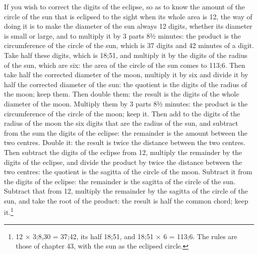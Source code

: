 \documentclass[11pt]{article}
\begin{document}
\par If you wish to correct the digits of the eclipse, so as to know the amount of the circle of the sun that is eclipsed to the sight when its whole area is 12, the way of doing it is to make the diameter of the sun always 12 digits, whether its diameter is small or large, and to multiply it by 3 parts 8½ minutes: the product is the circumference of the circle of the sun, which is 37 digits and 42 minutes of a digit. Take half these digits, which is 18;51, and multiply it by the digits of the radius of the sun, which are six: the area of the circle of the sun comes to 113;6. Then take half the corrected diameter of the moon, multiply it by six and divide it by half the corrected diameter of the sun: the quotient is the digits of the radius of the moon; keep them. Then double them: the result is the digits of the whole diameter of the moon. Multiply them by 3 parts 8½ minutes: the product is the circumference of the circle of the moon; keep it. Then add to the digits of the radius of the moon the six digits that are the radius of the sun, and subtract from the sum the digits of the eclipse: the remainder is the amount between the two centres. Double it: the result is twice the distance between the two centres. Then subtract the digits of the eclipse from 12, multiply the remainder by the digits of the eclipse, and divide the product by twice the distance between the two centres: the quotient is the sagitta of the circle of the moon. Subtract it from the digits of the eclipse: the remainder is the sagitta of the circle of the sun. Subtract that from 12, multiply the remainder by the sagitta of the circle of the sun, and take the root of the product: the result is half the common chord; keep it.\footnote{12 × 3;8,30 = 37;42, its half 18;51, and 18;51 × 6 = 113;6. The rules are those of chapter 43, with the sun as the eclipsed circle.}\par
\end{document}
